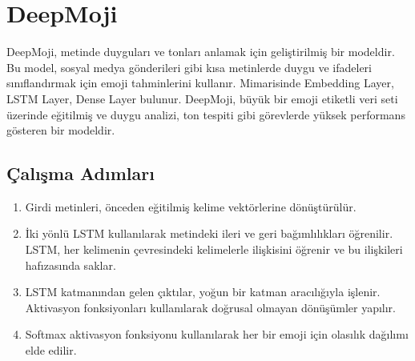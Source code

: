 \section{DeepMoji}
DeepMoji, metinde duyguları ve tonları anlamak için geliştirilmiş bir modeldir. Bu model, sosyal medya gönderileri gibi kısa metinlerde duygu ve ifadeleri sınıflandırmak için emoji tahminlerini kullanır. Mimarisinde Embedding Layer, LSTM Layer, Dense Layer bulunur. DeepMoji, büyük bir emoji etiketli veri seti üzerinde eğitilmiş ve duygu analizi, ton tespiti gibi görevlerde yüksek performans gösteren bir modeldir.

\subsection{Çalışma Adımları}
\begin{enumerate}
	\item Girdi metinleri, önceden eğitilmiş kelime vektörlerine dönüştürülür.
	\item İki yönlü LSTM kullanılarak metindeki ileri ve geri bağımlılıkları öğrenilir. LSTM, her kelimenin çevresindeki kelimelerle ilişkisini öğrenir ve bu ilişkileri hafızasında saklar.
	\item LSTM katmanından gelen çıktılar, yoğun bir katman aracılığıyla işlenir. Aktivasyon fonksiyonları kullanılarak doğrusal olmayan dönüşümler yapılır.
	\item Softmax aktivasyon fonksiyonu kullanılarak her bir emoji için olasılık dağılımı elde edilir.
\end{enumerate}

\newpage